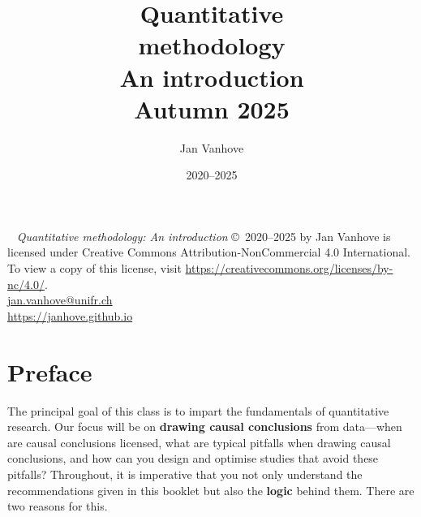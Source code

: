 \documentclass[a4paper]{tufte-book}\usepackage[]{graphicx}\usepackage[]{xcolor}
\title[Quantitative methodology]{{%
  \setlength{\parindent}{0pt}%
  Quantitative\\
  methodology\\%
  \vspace{1.8cm}%
  {\Huge An introduction}\\%
  \vspace{1.8cm}
  {\huge Autumn 2025}
}}
\date{2020--2025}
\author{Jan Vanhove}
\begin{document}
\frontmatter

\maketitle

\newpage
\begin{fullwidth}
~\vfill
\thispagestyle{empty}
\setlength{\parindent}{0pt}
\setlength{\parskip}{\baselineskip}
\textit{Quantitative methodology: An introduction} \copyright\ 2020--2025 by Jan Vanhove is licensed under Creative Commons Attribution-NonCommercial 4.0 International. \\
To view a copy of this license, visit \url{https://creativecommons.org/licenses/by-nc/4.0/}. \\
\url{jan.vanhove@unifr.ch} \\
\url{https://janhove.github.io}





\end{fullwidth}


\chapter{Preface}
The principal goal of this class is to impart the fundamentals of
quantitative research. Our focus will be on \textbf{drawing causal conclusions}
from data---when are causal conclusions licensed, what are typical pitfalls
when drawing causal conclusions,
and how can you design and optimise studies that avoid these pitfalls?
Throughout, it is imperative that you not only understand the recommendations
given in this booklet but also the \textbf{logic} behind them.
There are two reasons for this.
\end{document}
